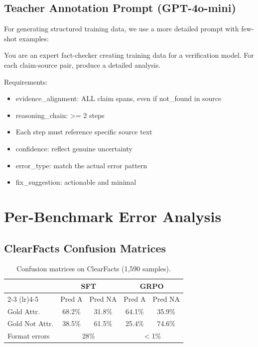 \documentclass[11pt]{article}
\begin{document}
\subsection{Teacher Annotation Prompt (GPT-4o-mini)}

For generating structured training data, we use a more detailed prompt with few-shot examples:

\begin{examplebox}[title={Teacher annotation prompt (abbreviated)}]
\footnotesize\ttfamily
You are an expert fact-checker creating training
data for a verification model. For each
claim-source pair, produce a detailed analysis.

\vspace{2pt}
\rmfamily Requirements:
\begin{itemize}[nosep,leftmargin=*,font=\ttfamily\footnotesize]
\item evidence\_alignment: ALL claim spans,
  even if not\_found in source
\item reasoning\_chain: >= 2 steps
\item Each step must reference specific source text
\item confidence: reflect genuine uncertainty
\item error\_type: match the actual error pattern
\item fix\_suggestion: actionable and minimal
\end{itemize}
\end{examplebox}


\section{Per-Benchmark Error Analysis}
\label{app:error}

\subsection{ClearFacts Confusion Matrices}

\begin{table}[h]
\centering
\small
\caption{Confusion matrices on ClearFacts (1,590 samples).}
\label{tab:confusion_full}
\setlength{\tabcolsep}{4pt}
\begin{tabular}{lcccc}
\toprule
& \multicolumn{2}{c}{\textbf{SFT}} & \multicolumn{2}{c}{\textbf{GRPO}} \\
\cmidrule(lr){2-3} \cmidrule(lr){4-5}
& Pred A & Pred NA & Pred A & Pred NA \\
\midrule
Gold Attr. & 68.2\% & 31.8\% & 64.1\% & 35.9\% \\
Gold Not Attr. & 38.5\% & 61.5\% & 25.4\% & 74.6\% \\
\midrule
Format errors & \multicolumn{2}{c}{28\%} & \multicolumn{2}{c}{$<$1\%} \\
\bottomrule
\end{tabular}
\end{table}
\end{document}
